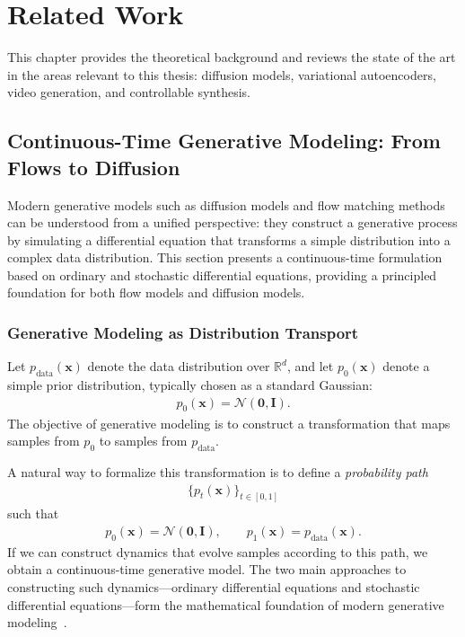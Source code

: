 \chapter{Related Work}
\label{ch:related_work}

This chapter provides the theoretical background and reviews the state of the art in the areas relevant to this thesis: diffusion models, variational autoencoders, video generation, and controllable synthesis.

\section{Continuous-Time Generative Modeling: From Flows to Diffusion}
\label{sec:diffusion_models}

Modern generative models such as diffusion models and flow matching methods can be understood from a unified perspective: they construct a generative process by simulating a differential equation that transforms a simple distribution into a complex data distribution. This section presents a continuous-time formulation based on ordinary and stochastic differential equations, providing a principled foundation for both flow models and diffusion models.

\subsection{Generative Modeling as Distribution Transport}
\label{subsec:distribution_transport}

Let $p_{\text{data}}(\mathbf{x})$ denote the data distribution over $\mathbb{R}^d$, and let $p_0(\mathbf{x})$ denote a simple prior distribution, typically chosen as a standard Gaussian:
\begin{align}
    p_0(\mathbf{x}) = \mathcal{N}(\mathbf{0}, \mathbf{I}).
    \label{eq:prior}
\end{align}
The objective of generative modeling is to construct a transformation that maps samples from $p_0$ to samples from $p_{\text{data}}$.

A natural way to formalize this transformation is to define a \emph{probability path}
\begin{align}
    \{p_t(\mathbf{x})\}_{t \in [0,1]}
    \label{eq:prob_path}
\end{align}
such that
\begin{align}
    p_0(\mathbf{x}) = \mathcal{N}(\mathbf{0}, \mathbf{I}), \qquad p_1(\mathbf{x}) = p_{\text{data}}(\mathbf{x}).
    \label{eq:path_boundary}
\end{align}
If we can construct dynamics that evolve samples according to this path, we obtain a continuous-time generative model. The two main approaches to constructing such dynamics---ordinary differential equations and stochastic differential equations---form the mathematical foundation of modern generative modeling~\cite{song2021scorebased, lipman2023flow, chen2018neural}.

